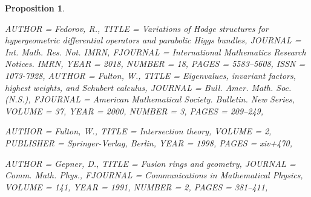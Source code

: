 \documentclass[11pt]{amsart}
\newtheorem{proposition}[theorem]{Proposition}
\numberwithin{theorem}{subsection}
\begin{document}
{\begin{proposition}
\begin{bibdiv}
\begin{biblist}
 {
    AUTHOR = {Fedorov, R.},
     TITLE = {Variations of {H}odge structures for hypergeometric
              differential operators and parabolic {H}iggs bundles},
   JOURNAL = {Int. Math. Res. Not. IMRN},
  FJOURNAL = {International Mathematics Research Notices. IMRN},
      YEAR = {2018},
    NUMBER = {18},
     PAGES = {5583--5608},
      ISSN = {1073-7928},
}
 {
    AUTHOR = {Fulton, W.},
     TITLE = {Eigenvalues, invariant factors, highest weights, and
              {S}chubert calculus},
   JOURNAL = {Bull. Amer. Math. Soc. (N.S.)},
  FJOURNAL = {American Mathematical Society. Bulletin. New Series},
    VOLUME = {37},
      YEAR = {2000},
    NUMBER = {3},
     PAGES = {209--249},
}



 {
    AUTHOR = {Fulton, W.},
     TITLE = {Intersection theory},
    VOLUME = {2},
 PUBLISHER = {Springer-Verlag, Berlin},
      YEAR = {1998},
     PAGES = {xiv+470},
}



 {
    AUTHOR = {Gepner, D.},
     TITLE = {Fusion rings and geometry},
   JOURNAL = {Comm. Math. Phys.},
  FJOURNAL = {Communications in Mathematical Physics},
    VOLUME = {141},
      YEAR = {1991},
    NUMBER = {2},
     PAGES = {381--411},
}


\end{biblist}
\end{bibdiv}
\end{proposition}}
\end{document}
